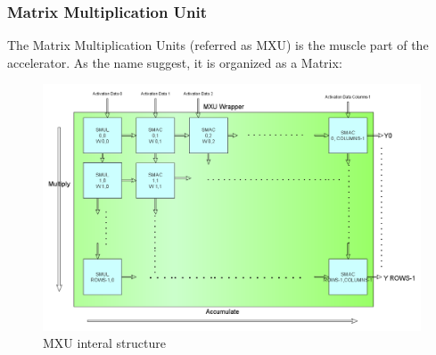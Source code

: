 \subsubsection{Matrix Multiplication Unit}
The Matrix Multiplication Units (referred as MXU) is the muscle part of the accelerator.
As the name suggest, it is organized as a Matrix:
\begin{figure}[H]
\centering
\captionsetup{justification=centering}
\includegraphics[scale=0.35,angle=0]{./figure/mxu.png}
\caption{MXU interal structure}
\label{fig:mxu}
\end{figure} 

